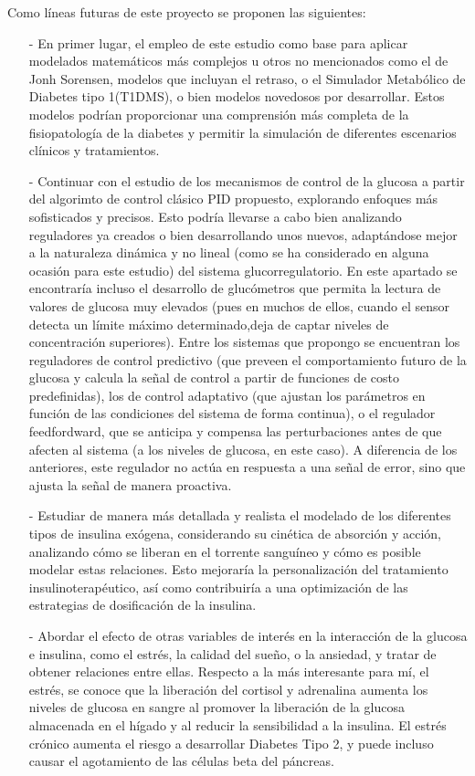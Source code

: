 


Como líneas futuras de este proyecto se proponen las siguientes:
\begin{enumerate}
    \item [-] En primer lugar, el empleo de este estudio como base para aplicar modelados matemáticos más complejos u otros no mencionados como el de Jonh Sorensen, modelos que incluyan el retraso, o el Simulador Metabólico de Diabetes tipo 1(T1DMS), o bien modelos novedosos por desarrollar. Estos modelos podrían proporcionar una comprensión más completa de la fisiopatología de la diabetes y permitir la simulación de diferentes escenarios clínicos y tratamientos.
    \item[-] Continuar con el estudio de los mecanismos de control de la glucosa a partir del algorimto de control clásico PID propuesto, explorando enfoques más sofisticados y precisos. Esto podría llevarse a cabo bien analizando reguladores ya creados o bien desarrollando unos nuevos, adaptándose mejor a la naturaleza dinámica y no lineal (como se ha considerado en alguna ocasión para este estudio) del sistema glucorregulatorio. En este apartado se encontraría incluso el desarrollo de glucómetros que permita la lectura de valores de glucosa muy elevados (pues en muchos de ellos, cuando el sensor detecta un límite máximo determinado,deja de captar niveles de concentración superiores). Entre los sistemas que propongo se encuentran los reguladores de control predictivo (que preveen el comportamiento futuro de la glucosa y calcula la señal de control a partir de funciones de costo predefinidas), los de control adaptativo (que ajustan los parámetros en función de las condiciones del sistema de forma continua), o el regulador feedfordward, que se anticipa y compensa las perturbaciones antes de que afecten al sistema (a los niveles de glucosa, en este caso). A diferencia de los anteriores, este regulador no actúa en respuesta a una señal de error, sino que ajusta la señal de manera proactiva. 
    \item [-] Estudiar de manera más detallada y realista el modelado de los diferentes tipos de insulina exógena, considerando su cinética de absorción y acción, analizando cómo se liberan en el torrente sanguíneo y cómo es posible modelar estas relaciones. Esto mejoraría la personalización del tratamiento insulinoterapéutico, así como contribuiría a una optimización de las estrategias de dosificación de la insulina.
    \item[-] Abordar el efecto de otras variables de interés en la interacción de la glucosa e insulina, como el estrés, la calidad del sueño, o la ansiedad, y tratar de obtener relaciones entre ellas. Respecto a la más interesante para mí, el estrés, se conoce que la liberación del cortisol y adrenalina aumenta los niveles de glucosa en sangre al promover la liberación de la glucosa almacenada en el hígado y al reducir la sensibilidad a la insulina. El estrés crónico aumenta el riesgo a desarrollar Diabetes Tipo 2, y puede incluso causar el agotamiento de las células beta del páncreas.

\end{enumerate}

